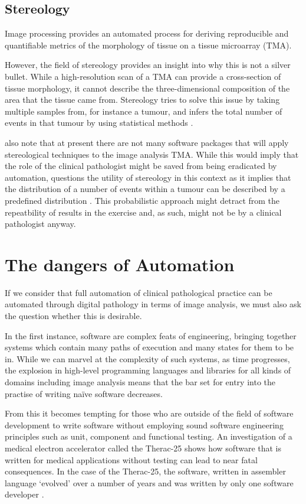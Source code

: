 \documentclass[12pt]{article}
\begin{document}
\subsection{Stereology}
Image processing provides an automated process for deriving reproducible and quantifiable metrics of the 
morphology of tissue on a tissue microarray (TMA).

However, the field of stereology provides an insight into why this is not a silver bullet. While a high-resolution 
scan of a TMA can provide a cross-section of tissue morphology, it cannot describe the three-dimensional 
composition of the area that the tissue came from. Stereology tries to solve this issue by taking multiple samples 
from, for instance a tumour, and infers the total number of events in that tumour by using statistical methods 
\parencite{webster2014whole}.

\citeauthor{webster2014whole} also note that at present there are not many software packages that will apply 
stereological techniques to the image analysis TMA. While this would imply that the role of the clinical pathologist 
might be saved from being eradicated by automation, \citeauthor{suvarna2013bancroft} questions the utility of 
stereology in this context as it implies that the distribution of a number of events within a tumour can be described 
by a predefined distribution \parencite[p.~540, Ch.~23.]{suvarna2013bancroft}. This probabilistic approach might 
detract from the repeatbility of results in the exercise and, as such, might not be by a clinical pathologist anyway.

\section{The dangers of Automation}
If we consider that full automation of clinical pathological practice can be automated through digital pathology in 
terms of image analysis, we must also ask the question whether this is desirable.

In the first instance, software are complex feats of engineering, bringing together systems which contain many 
paths of execution and many states for them to be in. While we can marvel at the complexity of such systems, 
as time progresses, the explosion in high-level programming languages and libraries for all kinds of domains including 
image analysis means that the bar set for entry into the practise of writing na\"{i}ve software decreases.

From this it becomes tempting for those who are outside of the field of software development to write software without 
employing sound software engineering principles such as unit, component and functional testing. An investigation of a 
medical electron accelerator called the Therac-25 shows how software that is written for medical applications without 
testing can lead to near fatal consequences. In the case of the Therac-25, the software, written in assembler language 
`evolved' over a number of years and was written by only one software developer \parencite{leveson1993investigation}.
\end{document}
